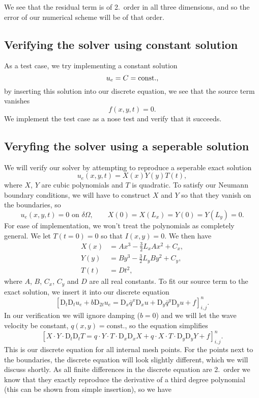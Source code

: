 \documentclass[a4paper, 11pt, notitlepage, english]{article}
\newcommand{\D}{\mbox{D}}
\begin{document}
We see that the residual term is of 2.\ order in all three dimensions, and so the error of our numerical scheme will be of that order.

\subsection*{Verifying the solver using constant solution}
As a test case, we try implementing a constant solution
$$u_e = C = {\rm const.},$$
by inserting this solution into our discrete equation, we see that the source term vanishes
$$f(x,y,t) = 0.$$
We implement the test case as a nose test and verify that it succeeds.

\subsection*{Veryfing the solver using a seperable solution}
We will verify our solver by attempting to reproduce a seperable exact solution
$$u_e(x,y,t) = X(x)Y(y)T(t),$$
where $X$, $Y$ are cubic polynomials and $T$ is quadratic. To satisfy our Neumann boundary conditions, we will have to construct $X$ and $Y$ so that they vanish on the boundaries, so
$$u_e(x,y,t) = 0 \mbox{ on } \delta\Omega, \qquad X(0)=X(L_x)=Y(0)=Y(L_y)=0.$$
For ease of implementation, we won't treat the polynomials as completely general. We let $T(t=0)=0$ so that $I(x,y)=0$. We then have
\begin{align*}
X(x) &= A x^3 -\frac{3}{2}L_xAx^2 + C_x, \\
Y(y) &= B y^3 -\frac{3}{2}L_yBy^2 + C_y, \\
T(t) &= D t^2,
\end{align*}
where $A$, $B$, $C_x$, $C_y$ and $D$ are all real constants. To fit our source term to the exact solution, we insert it into our discrete equation
$$[\D_t\D_t u_e + b\D_{2t}u_e = \D_x \overline{q}^{x}\D_x u + \D_y \overline{q}^y \D_y u + f]^{n}_{i,j}.$$
In our verification we will ignore damping ($b=0$) and we will let the wave velocity be constant, $q(x,y)=\mbox{const.}$, so the equation simplifies 
$$[X\cdot Y\cdot \D_t\D_t T = q\cdot  Y\cdot T\cdot  \D_x \D_x X + q\cdot  X\cdot T\cdot  \D_y \D_y Y + f]^{n}_{i,j}.$$
This is our discrete equation for all internal mesh points. For the points next to the boundaries, the discrete equation will look slightly different, 
which we will discuss shortly. As all finite differences in the discrete equation are 2.\ order we know that they exactly reproduce the derivative of 
a third degree polynomial (this can be shown from simple insertion), so we have
\end{document}
